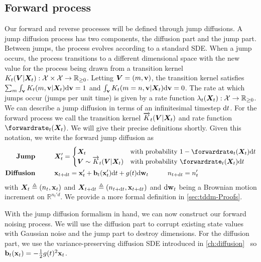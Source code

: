 \subsection{Forward process}
\label{sec:tddm-jump-diff-proc}

Our forward and reverse processes will be defined through jump diffusions. A jump diffusion process has two components, the diffusion part and the jump part. Between jumps, the process evolves according to a standard SDE. When a jump occurs, the process transitions to a different dimensional space with the new value for the process being drawn from a transition kernel $K_t({\bm{V}} | {\bm{X}}_t): {\mathcal{X}} \times {\mathcal{X}} \rightarrow  \mathbb{R}_{\geq 0}$. Letting ${\bm{V}} = (m, {\mathbf{v}})$, the transition kernel satisfies $\sum_m \int_{\mathbf{v}} K_t(m, {\mathbf{v}} | {\bm{X}}_t) \mathrm{d} {\mathbf{v}} = 1$ and $\int_{\mathbf{v}} K_t(m=n, {\mathbf{v}} | {\bm{X}}_t) \mathrm{d} {\mathbf{v}} = 0$. The rate at which jumps occur (jumps per unit time) is given by a rate function $\lambda_t({\bm{X}}_t): \mathcal{X} \rightarrow \mathbb{R}_{\geq 0}$. 
We can describe a jump diffusion in terms of an infinitesimal timestep $\mathrm{d} t$. For the forward process we call the transition kernel $\overrightarrow{K}_t({\bm{V}}|{\bm{X}}_t)$ and rate function $\forwardrate_t(\mX_t)$. We will give their precise definitions shortly. Given this notation, we write the forward jump diffusion as
\begin{align}
    \textbf{Jump} \hspace{1cm} & \mX_t' = \begin{cases}
        \mX_t & \text{with probability } 1 - \forwardrate_t(\mX_t) \rmd t \\
        \mV \sim \ftk_t( \mV |\mX_t) & \text{with probability } \forwardrate_t(\mX_t) \rmd t
    \end{cases}  \label{eq:tddm-forward-jump} \\
    \textbf{Diffusion} \hspace{1cm} &\rvx_{t+ \rmd t} = \rvx'_t + \rvb_t(\rvx'_t) \rmd t + g(t) \rmd \brown_t \hspace{1cm} n_{t+\rmd t} = n_t'
     \label{eq:tddm-forward-diffusion}
\end{align}
with ${\bm{X}}_t \triangleq (n_t, {\mathbf{x}}_t)$ and ${\bm{X}}_{t+\mathrm{d} t} \triangleq (n_{t+\mathrm{d} t}, {\mathbf{x}}_{t + \mathrm{d} t})$ and $\mathrm{d} \mathbf{w}_t$ being a Brownian motion increment on $\mathbb{R}^{n_t'd}$. We provide a more formal definition in \cref{sec:tddm-Proofs}.

With the jump diffusion formalism in hand, we can now construct our forward noising process. We will use the diffusion part to corrupt existing state values with Gaussian noise and the jump part to destroy dimensions. For the diffusion part, we use the variance-preserving diffusion SDE introduced in \cref{ch:diffusion}~\cite{ho2020denoising, song2020score} so ${\mathbf{b}}_t({\mathbf{x}}_t) = -\frac{1}{2}g(t)^2 {\mathbf{x}}_t$.

